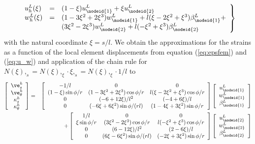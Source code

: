 \begin{eqnarray}
\left.
\begin{array}{lcl}
u^L_h(\xi) & = & (1 - \xi) u_{\nodeid{1}}^L + \xi u_{\nodeid{2}}^L \\  
w^L_h(\xi) & = & (1 - 3 \xi^2 + 2 \xi^3) w_{\nodeid{1}}^L + l (\xi - 2 \xi^2 + 
\xi^3) \beta_{\nodeid{1}}^L + \\
 & & (3 \xi^2 - 2 \xi^3) w_{\nodeid{2}}^L + l(- \xi^2 + \xi^3) \beta_{\nodeid{2}}^L
 \end{array}
\right\}  
\label{eq:u_w}
\end{eqnarray}
with the natural coordinate $\xi = s/l$.
We obtain the approximations for the strains as a function 
of the local element displacements from equation 
(\ref{eq:epsfem}) and (\ref{eq:u_w}) and application of 
the chain rule for $N(\xi),_s = N(\xi),_\xi \cdot \xi,_s = N(\xi),_\xi \cdot 1/l$ to
\begin{eqnarray*}
\left[ 
\begin{array}{c}
\ve_s^h \\ \ve_\theta^h \\ \kappa_s^h \\ \kappa_\theta^h
\end{array}
\right]  & = & \left[ 
\begin{array}{ccc}
-1/l & 0 & 0 \\
(1 - \xi)\sin \phi / r & (1 - 3 \xi^2 + 2 \xi^3) \cos \phi / r & l(\xi - 2
\xi^2 + \xi^3) \cos \phi / r \\
0 & (-6 + 12 \xi) / l^2 & (-4 + 6 \xi) / l \\
0 & (-6 \xi + 6 \xi^2) \sin \phi / (rl) & (1 - 4 \xi + 3 \xi^2)\sin 
\phi / r
\end{array}
\right]
\left[ 
\begin{array}{c}
u_{\nodeid{1}}^L \\ w_{\nodeid{1}}^L \\ \beta_{\nodeid{1}}^L
\end{array}
\right]    \\  
  & & + \left[ 
\begin{array}{ccc}
1/l & 0 & 0 \\
 \xi \sin \phi / r & ( 3 \xi^2 - 2 \xi^3) \cos \phi / r & l(- \xi^2 
 + \xi^3) \cos \phi / r \\
0 & (6 - 12 \xi) / l^2 & ( 2 - 6 \xi) / l \\
0 & ( 6 \xi - 6 \xi^2) \sin \phi / (rl) & (  - 2 \xi + 3 \xi^2)\sin 
\phi / r
\end{array}
\right]
\left[ 
\begin{array}{c}
u_{\nodeid{2}}^L \\ w_{\nodeid{2}}^L \\ \beta_{\nodeid{2}}^L
\end{array}
\right]
\end{eqnarray*}
